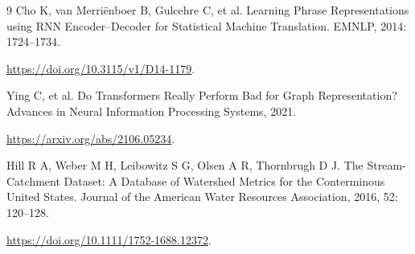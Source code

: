 \documentclass[UTF8,11pt,a4paper,fontset=none]{ctexart}
\begin{document}
\begin{thebibliography}{9}
 Cho K, van Merriënboer B, Gulcehre C, et al. Learning Phrase Representations using RNN Encoder--Decoder for Statistical Machine Translation. EMNLP, 2014: 1724--1734.
\par\nobreak\url{https://doi.org/10.3115/v1/D14-1179}.

 Ying C, et al. Do Transformers Really Perform Bad for Graph Representation? Advances in Neural Information Processing Systems, 2021.
\par\nobreak\url{https://arxiv.org/abs/2106.05234}.

 Hill R A, Weber M H, Leibowitz S G, Olsen A R, Thornbrugh D J. The Stream-Catchment Dataset: A Database of Watershed Metrics for the Conterminous United States. Journal of the American Water Resources Association, 2016, 52: 120--128.
\par\nobreak\url{https://doi.org/10.1111/1752-1688.12372}.

\end{thebibliography}
\end{document}
